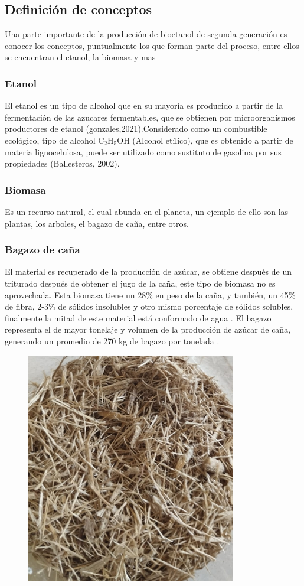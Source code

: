 \documentclass[12pt]{article}
\begin{document}
	
		\subsection{ Definición de conceptos }
		
		
		Una parte  importante de la producción de bioetanol de segunda generación es conocer los conceptos, puntualmente los que forman parte del proceso, entre ellos se encuentran el etanol, la biomasa y mas 
		\subsubsection{Etanol}
		El etanol es un tipo de alcohol que en su mayoría es producido a partir de la  fermentación de las azucares fermentables, que se obtienen por microorganismos productores de etanol \cite{} (gonzales,2021).Considerado como un combustible ecológico, tipo de alcohol $\text{C}_2\text{H}_5\text{OH}$ (Alcohol etílico), que es obtenido a partir de materia lignocelulosa, puede ser utilizado como sustituto de gasolina por sus propiedades (Ballesteros, 2002).
		
		\subsubsection{Biomasa}
	Es un recurso natural, el cual abunda en el planeta, un ejemplo de ello son las plantas, los arboles, el bagazo de caña, entre otros.
		
		\subsubsection{Bagazo de caña}
		El material es recuperado de la producción de azúcar, se obtiene después de un triturado después de obtener el jugo de la caña, este tipo de biomasa no es aprovechada. Esta biomasa tiene un 28\% en peso de la caña, y también, un 45\% de fibra, 2-3\% de sólidos insolubles y otro mismo porcentaje de sólidos solubles, finalmente la mitad de este material está conformado de agua \cite{olmo2015bagazo}.
		El bagazo representa el de mayor tonelaje y volumen de la producción de azúcar de caña, generando un promedio de 270 kg de bagazo por tonelada \cite{perez2022efecto}.
		
		\begin{figure}[h]
			\centering
			\includegraphics[width=0.4\linewidth]{imagenes/bagazo}
			\caption[Bagazo de caña]{}
			\label{fig:bagazo}
		\end{figure}
		
\end{document}
